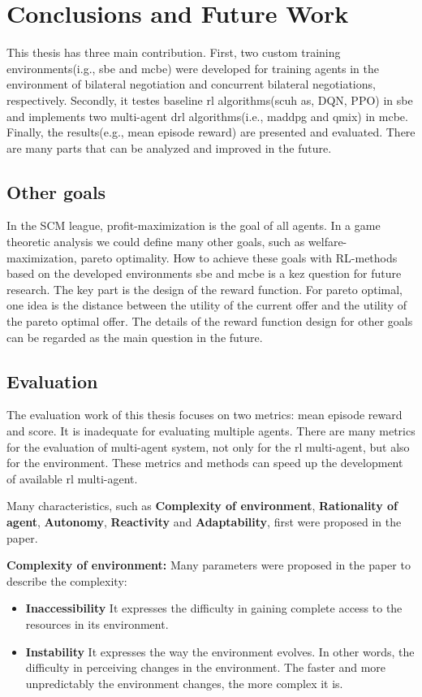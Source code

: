 \chapter{Conclusions and Future Work}
This thesis has three main contribution. First, two custom training environments(i.g., \gls{sbe} and \gls{mcbe}) were developed for training agents in the environment of bilateral negotiation and concurrent bilateral negotiations, respectively. Secondly, it testes baseline \gls{rl} algorithms(scuh as, DQN, PPO) in \gls{sbe} and implements two multi-agent drl algorithms(i.e., maddpg and qmix) in \gls{mcbe}. Finally, the results(e.g., mean episode reward) are presented and evaluated. There are many parts that can be analyzed and improved in the future.

\section{Other goals}
In the SCM league, profit-maximization is the goal of all agents. In a game theoretic analysis we could define many other goals, such as welfare-maximization, pareto optimality. How to achieve these goals with RL-methods based on the developed environments \gls{sbe} and \gls{mcbe} is a kez question for future research. The key part is the design of the reward function. For pareto optimal, one idea is the distance between the utility of the current offer and the utility of the pareto optimal offer. The details of the reward function design for other goals can be regarded as the main question in the future.

\section{Evaluation}
The evaluation work of this thesis focuses on two metrics: mean episode reward and score. It is inadequate for evaluating multiple agents. There are many metrics for the evaluation of multi-agent system, not only for the \gls{rl} multi-agent, but also for the environment. These metrics and methods can speed up the development of available \gls{rl} multi-agent. 

Many characteristics, such as \textbf{Complexity of environment}, \textbf{Rationality of agent}, \textbf{Autonomy}, \textbf{Reactivity} and \textbf{Adaptability}, first were proposed in the paper\parencite{Bitonto2010}.

\textbf{Complexity of environment:} Many parameters were proposed in the paper to describe the complexity:
\begin{itemize}
\item \textbf{Inaccessibility} It expresses the difficulty in gaining complete access to the resources in its environment.
\item \textbf{Instability} It expresses the way the environment evolves. In other words, the difficulty in perceiving changes in the environment. The faster and more unpredictably the environment changes, the more complex it is.
\end{itemize}

